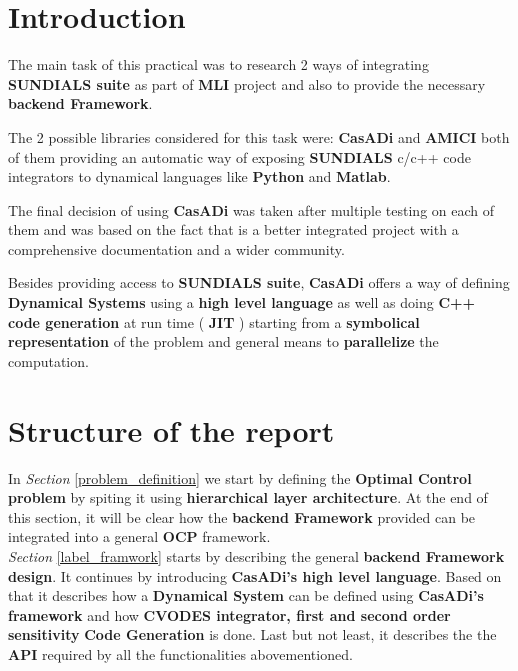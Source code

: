 \documentclass[12pt, letterpaper]{article}
\begin{document}
\section{Introduction}
The main task of this practical was to research 2 ways of integrating \textbf{SUNDIALS suite} as part of \textbf{MLI}  project and also to provide the necessary  \textbf{backend Framework}.

The 2 possible libraries considered for this task were: \textbf{CasADi} \cite{Andersson2018} and \textbf{AMICI} \cite{frohlich2020amici} both of them providing an automatic way of exposing \textbf{SUNDIALS} c/c++ code integrators to dynamical languages like \textbf{Python} and \textbf{Matlab}.

The final decision of using \textbf{CasADi} was taken after multiple testing on each of them and was based on the fact that is a better integrated project with a comprehensive documentation and a wider community. 


Besides providing access to \textbf{SUNDIALS suite}, \textbf{CasADi} offers a way of defining \textbf{Dynamical Systems} using a \textbf{high level language} as well as doing \textbf{C++ code generation} at run time ( \textbf{JIT} ) starting from a \textbf{symbolical representation} of the problem and general means to \textbf{parallelize} the computation.
 
\section{Structure of the report}


In \textit{Section} \ref{problem_definition} we start by defining the \textbf{Optimal Control problem} by spiting it using \textbf{hierarchical layer architecture}. At the end of this section, it will be clear how the \textbf{backend Framework} provided can be integrated into a general \textbf{OCP} framework.\\



\textit{Section} \ref{label_framwork} starts by describing the general \textbf{backend Framework design}. It continues by introducing \textbf{CasADi's high level language}. Based on that it describes how a \textbf{Dynamical System} can be defined using \textbf{CasADi's framework} and how \textbf{CVODES integrator, first and second order sensitivity}   \textbf{Code Generation} is done. 
Last but not least, it describes the the \textbf{API} required by all the functionalities abovementioned.\\
\end{document}
